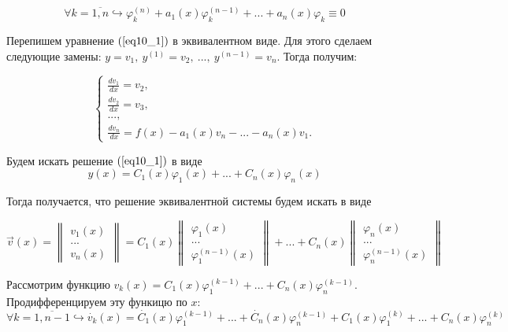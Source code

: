 \begin{equation}\label{eq10_2}
\forall k = \overline{1,n} \hookrightarrow \varphi_k^{(n)} + a_1(x)\varphi_k^{(n-1)} + ... + a_n(x)\varphi_k \equiv 0
\end{equation}

Перепишем уравнение $(\ref{eq10_1})$ в эквивалентном виде. Для этого сделаем следующие замены: $y = v_1, ~y^{(1)} = v_2,~..., ~y^{(n-1)} = v_n$. Тогда получим:

\begin{equation}\label{eq10_3}
 \begin{cases}
   \frac{dv_1}{dx} = v_2, 
   \\
   \frac{dv_2}{dx} = v_3,
   \\
   ...,
   \\
   \frac{dv_n}{dx} = f(x) - a_1(x)v_n - ... - a_n(x)v_1.
 \end{cases}
\end{equation}

Будем искать решение $(\ref{eq10_1})$ в виде
\[y(x) = C_1(x)\varphi_1(x) + ... + C_n(x)\varphi_n(x)\]

Тогда получается, что решение эквивалентной системы будем искать в виде

\begin{equation}
\vec{v}(x) = 
	\begin{Vmatrix}
  		v_1(x)\\
  		...\\
  		v_n(x)
	\end{Vmatrix} = C_1(x)
		\begin{Vmatrix}
  			\varphi_1(x)\\
  			...\\
  			\varphi_1^{(n-1)}(x)
		\end{Vmatrix} + ... + C_n(x)
			\begin{Vmatrix}
  				\varphi_n(x)\\
  				...\\
  				\varphi_n^{(n-1)}(x)
			\end{Vmatrix}
\end{equation}

Рассмотрим функцию $v_k(x) = C_1(x)\varphi_1^{(k-1)} + ... + C_n(x)\varphi_n^{(k-1)}$. Продифференцируем эту функицю по $x$:
\begin{equation}
\forall k =\overline{1, n-1} \hookrightarrow \dot{v_k}(x) = \dot{C_1}(x)\varphi_1^{(k-1)} + ... + \dot{C_n}(x)\varphi_n^{(k-1)} + C_1(x)\varphi_1^{(k)} + ... + C_n(x)\varphi_n^{(k)}
\end{equation}

